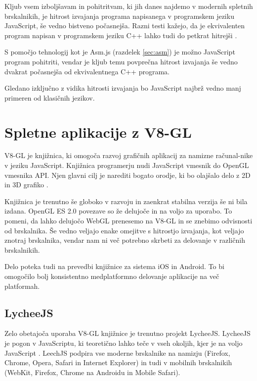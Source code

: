 Kljub vsem izboljšavam in pohitritvam, ki jih danes najdemo v modernih spletnih brskalnikih, je hitrost izvajanja programa napisanega v programskem jeziku JavaScript, še vedno bistveno počasnejša. Razni testi kažejo, da je ekvivalenten program napisan v programskem jeziku C++ lahko tudi do petkrat hitrejši \cite{jsperformance}.

S pomočjo tehnologij kot je Asm.js (razdelek \ref{sec:asm}) je možno JavaScript program pohitriti, vendar je kljub temu povprečna hitrost izvajanja še vedno dvakrat počasnejša od ekvivalentnega C++ programa.

Gledano izključno z vidika hitrosti izvajanja bo JavaScript najbrž vedno manj primeren od klasičnih jezikov.

\section{Spletne aplikacije z V8-GL}

V8-GL je knjižnica, ki omogoča razvoj grafičnih aplikacij za namizne računal-nike v jeziku JavaScript. Knjižnica programerju nudi JavaScript vmesnik do OpenGL vmesnika API. Njen glavni cilj je narediti bogato orodje, ki bo olajšalo delo z 2D in 3D grafiko \cite{v8gl}.

Knjižnica je trenutno še globoko v razvoju in zaenkrat stabilna verzija še ni bila izdana. OpenGL ES 2.0 povezave so že delujoče in na voljo za uporabo. To pomeni, da lahko delujočo WebGL prenesemo na V8-GL in se znebimo odvisnosti od brskalnika. Še vedno veljajo enake omejitve s hitrostjo izvajanja, kot veljajo znotraj brskalnika, vendar nam ni več potrebno skrbeti za delovanje v različnih brskalnikih.

Delo poteka tudi na prevedbi knjižnice za sistema iOS in Android. To bi omogočilo bolj konsistentno medplatformno delovanje aplikacije na več platformah.

\subsection{LycheeJS}

Zelo obetajoča uporaba V8-GL knjižnice je trenutno projekt LycheeJS. LycheeJS je pogon v JavaScriptu, ki teoretično lahko teče v vseh okoljih, kjer je na voljo JavaScript  \cite{lycheejs}. LeechJS podpira vse moderne brskalnike na namizju (Firefox, Chrome, Opera, Safari in Internet Explorer) in tudi v mobilnih brskalnikih (WebKit, Firefox, Chrome na Androidu in Mobile Safari). 


